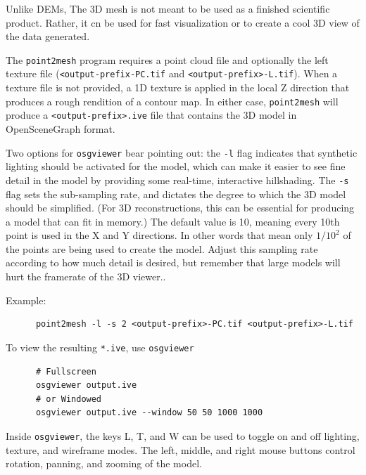 Unlike DEMs, The 3D mesh is not meant to be used as a finished
scientific product.  Rather, it cn be used for fast visualization or
to create a cool 3D view of the data generated. 

The \texttt{point2mesh} program requires a point cloud file and
optionally the left texture file (\texttt{<output-prefix-PC.tif}
and \texttt{<output-prefix>-L.tif}). When a texture file is not
provided, a 1D texture is applied in the local Z direction that
produces a rough rendition of a contour map.  In either case,
\texttt{point2mesh} will produce a \texttt{<output-prefix>.ive}
file that contains the 3D model in OpenSceneGraph format.

Two options for \texttt{osgviewer} bear pointing out: the \texttt{-l}
flag indicates that synthetic lighting should be activated for the
model, which can make it easier to see fine detail in the model by
providing some real-time, interactive hillshading.  The \verb#-s#
flag sets the sub-sampling rate, and dictates the degree to which
the 3D model should be simplified.  (For 3D reconstructions, this
can be essential for producing a model that can fit in memory.)
The default value is 10, meaning every 10th point is used in the X
and Y directions. In other words that mean only $1/10^2$ of the
points are being used to create the model. Adjust this sampling
rate according to how much detail is desired, but remember that
large models will hurt the framerate of the 3D viewer..

Example:
\begin{verbatim}
      point2mesh -l -s 2 <output-prefix>-PC.tif <output-prefix>-L.tif
\end{verbatim}

To view the resulting \verb#*.ive#, use \verb#osgviewer#

\begin{verbatim}
      # Fullscreen
      osgviewer output.ive
      # or Windowed
      osgviewer output.ive --window 50 50 1000 1000
\end{verbatim}

Inside \verb#osgviewer#, the keys L, T, and W can be used to toggle on
and off lighting, texture, and wireframe modes.  The left, middle, and
right mouse buttons control rotation, panning, and zooming of the
model.

